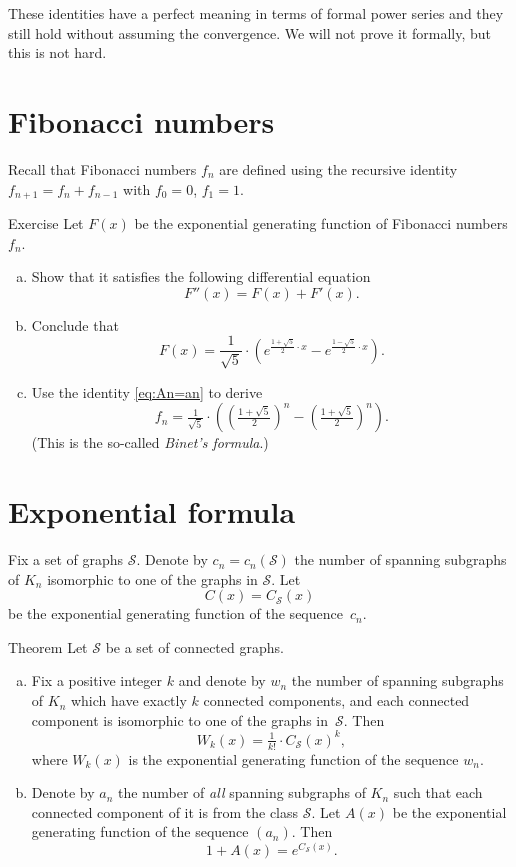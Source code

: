 These identities have a perfect meaning in terms of formal power series
and they still hold without assuming the convergence.
We will not prove it formally, but this is not hard.

\section*{Fibonacci numbers}

Recall that Fibonacci numbers $f_n$ are defined using the recursive identity 
$f_{n+1}=f_n+f_{n-1}$
with $f_0=0$, $f_1=1$.

\begin{thm}{Exercise}
Let $F(x)$ be the exponential generating function of Fibonacci numbers $f_n$.
\begin{enumerate}[(a)]
\item Show that it satisfies the following differential equation
\[F''(x)=F(x)+F'(x).\]
\item Conclude that 
\[F(x)=\frac{1}{\sqrt5}\cdot\left(e^{\frac{1+\sqrt{5}}{2}\cdot x}- e^{\frac{1-\sqrt{5}}{2}\cdot x}\right).\]
\item Use the identity \ref{eq:An=an} to derive 
\[f_n=\tfrac{1}{\sqrt5}\cdot\left((\tfrac{1+\sqrt{5}}{2})^n-(\tfrac{1+\sqrt{5}}{2})^n\right).\]
(This is the so-called \emph{Binet's formula}.) 
\end{enumerate}

\end{thm}


\section*{Exponential formula}

Fix a set of graphs $\mathcal{S}$.
Denote by $c_n=c_n(\mathcal{S})$ the number of spanning subgraphs of $K_n$ isomorphic to one of the graphs in $\mathcal{S}$. 
Let \[C(x)=C_{\mathcal{S}}(x)\] be the exponential generating function of the sequence~$c_n$. 


\begin{thm}{Theorem}\label{thm:exp-formula}
Let $\mathcal{S}$ be a set of connected graphs. 

\begin{enumerate}[(a)]
\item\label{thm:exp-formula:Wk} Fix a positive integer $k$ and denote by $w_n$ the number of spanning subgraphs of $K_n$ which have exactly $k$ connected components, and each connected component is  isomorphic to one of the graphs in~$\mathcal{S}$.
Then
\[W_k(x)=\tfrac1{k!}\cdot C_{\mathcal{S}}(x)^k,\]
where $W_k(x)$ is the exponential generating function of the sequence $w_n$.

\item\label{thm:exp-formula:all} Denote by $a_n$ the number of {}\emph{all} spanning subgraphs of $K_n$ such that each connected component of it is from the class $\mathcal{S}$.
Let $A(x)$ be the exponential generating function of the sequence $(a_n)$.
Then
\[1+A(x)=e^{C_{\mathcal{S}}(x)}.\]
\end{enumerate}

\end{thm}

